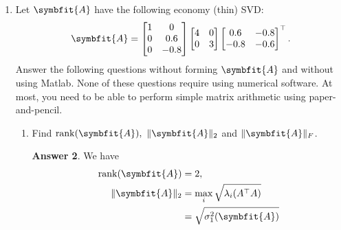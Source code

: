 \documentclass{article}
\theoremstyle{definition}
\newtheorem*{answer}{Answer}
\newcommand{\mat}[1]{\symbfit{#1}}
\begin{document}
\begin{enumerate}[leftmargin=\labelsep]
\begin{enumerate}
\begin{answer}
\[			            \]
			            Starting at the bottom, clearly \(\tilde{x}_4 = 2\). Then we have \(2\tilde{x}_3+2\tilde{x}_4=6\implies 2\tilde{x}_3+4=6\implies \tilde{x}_3=1\). Then we have \(\tilde{x}_2+\tilde{x}_3+\tilde{x}_4=5\implies \tilde{x}_2+1+2=5\implies \tilde{x}_2=2\). Finally, we have \(2\tilde{x}_1+\tilde{x}_2+\tilde{x}_3=5\implies 2\tilde{x}_1 + 2 + 1 = 5\implies \tilde{x}_1 = 1\). So,
			            \[
				            \boxed{\tilde{x} = \mqty[1\\2\\1\\2]}	.
			            \]
		            \end{answer}
	      \end{enumerate}

	\item Let \(\mat{A}\) have the following economy (thin) SVD:
	      \[
		      \mat{A} = \begin{bmatrix}
			      1 & 0    \\
			      0 & 0.6  \\
			      0 & -0.8
		      \end{bmatrix}
		      \begin{bmatrix}
			      4 & 0 \\
			      0 & 3
		      \end{bmatrix}
		      \begin{bmatrix}
			      0.6  & -0.8 \\
			      -0.8 & -0.6 \\
		      \end{bmatrix}^\top.
	      \]
	      Answer the following questions without forming \(\mat{A}\) and without using Matlab. None of these questions require using numerical software. At most, you need to be able to perform simple matrix arithmetic using paper-and-pencil.
	      \begin{enumerate}
		      \item Find \(\rank(\mat{A}),\ \|\mat{A}\|_2\) and \(\|\mat{A}\|_F\).
		            \begin{answer}
			            We have
			            \begin{align*}
				            \rank(\mat{A}) & = 2,                                                                                                   \\
				            \|\mat{A}\|_2  & = \max_i \sqrt{\lambda_i(A^\top A)}                                                                    \\
				                           & = \sqrt{\sigma_1^2(\mat{A})}                                                                           \\

\end{align*}
\end{answer}
\end{enumerate}
\end{enumerate}
\end{document}
